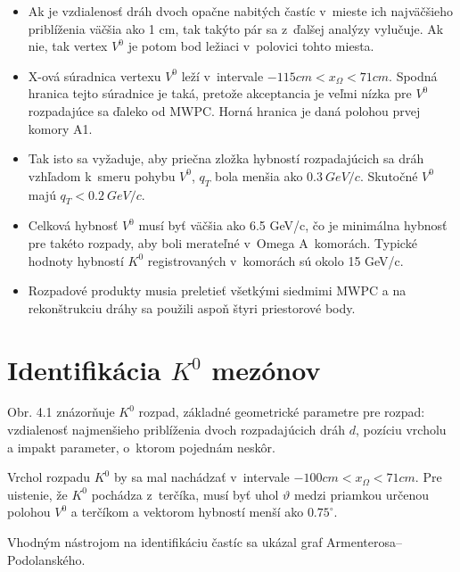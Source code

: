 \begin{itemize}
  \item{ Ak je vzdialenosť dráh dvoch opačne nabitých častíc  v~mieste ich
najväčšieho priblíženia väčšia ako 1 cm, tak takýto pár sa 
z~ďalšej analýzy  vylučuje. Ak nie, tak vertex $V^{0}$ je potom bod ležiaci 
v~polovici tohto miesta.}
  \item{X-ová súradnica vertexu $V^{0}$ leží v~intervale
$-115cm<x_{\Omega}<71cm$. Spodná hranica tejto súradnice je taká, pretože
akceptancia je veľmi nízka pre $V^{0}$ rozpadajúce sa ďaleko od MWPC. Horná
hranica je daná polohou prvej komory A1.}
  \item{Tak isto sa vyžaduje, aby priečna zložka hybností rozpadajúcich
sa dráh vzhľadom k~smeru pohybu $V^{0}$, $q_{T}$ bola menšia ako $0.3\:
GeV/c$. Skutočné $V^{0}$ majú $q_{T}<0.2\: GeV/c$.}
  \item{Celková hybnosť $V^{0}$ musí byť väčšia ako 6.5 GeV/c, čo je
minimálna hybnosť pre takéto rozpady, aby boli merateľné v~Omega A~komorách.
Typické hodnoty hybností $K^{0}$ registrovaných v~komorách sú okolo 15
GeV/c.}
  \item{Rozpadové produkty musia preletieť všetkými siedmimi MWPC a na
rekonštrukciu dráhy sa použili aspoň štyri priestorové body.}
\end{itemize}
\section{Identifikácia $K^{0}$ mezónov}  
Obr. 4.1 znázorňuje $K^{0}$ rozpad, základné 
geometrické parametre pre rozpad: vzdialenosť  najmenšieho priblíženia dvoch
rozpadajúcich dráh $d$, pozíciu vrcholu a impakt parameter, o~ktorom
pojednám neskôr.

Vrchol rozpadu $K^{0}$ by sa mal nachádzať v~intervale 
$-100cm<x_{\Omega}<71cm$. Pre uistenie, že $K^{0}$ pochádza 
z~terčíka, musí byť  uhol $\vartheta$ medzi priamkou určenou polohou $V^{0}$
a terčíkom a vektorom hybností menší ako $0.75^{\circ}$.

Vhodným nástrojom  na identifikáciu častíc sa ukázal  graf
Armenterosa--Podo\-lanského.

% 
% 


